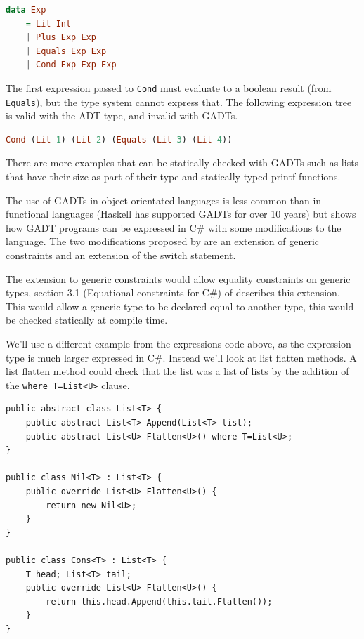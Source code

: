 \documentclass[english]{report}
\begin{document}
\begin{lstlisting}[caption={ADT},keywordstyle={\color{blue}},language=Haskell]
data Exp 
	= Lit Int
	| Plus Exp Exp 
	| Equals Exp Exp
	| Cond Exp Exp Exp
\end{lstlisting}


The first expression passed to \texttt{Cond} must evaluate to a boolean
result (from \texttt{Equals}), but the type system cannot express
that. The following expression tree is valid with the ADT type, and
invalid with GADTs.

\begin{lstlisting}[language=Haskell]
Cond (Lit 1) (Lit 2) (Equals (Lit 3) (Lit 4))
\end{lstlisting}


There are more examples that can be statically checked with GADTs
such as lists that have their size as part of their type and statically
typed printf functions.

The use of GADTs in object orientated languages is less common than
in functional languages (Haskell has supported GADTs for over 10 years)
but \cite{gadts} shows how GADT programs can be expressed in C\#
with some modifications to the language. The two modifications proposed
by \cite{gadts} are an extension of generic constraints and an extension
of the switch statement. 

The extension to generic constraints would allow equality constraints
on generic types, section 3.1 (Equational constraints for C\#) of
\cite{gadts} describes this extension. This would allow a generic
type to be declared equal to another type, this would be checked statically
at compile time. 

We'll use a different example from the expressions code above, as
the expression type is much larger expressed in C\#. Instead we'll
look at list flatten methods. A list flatten method could check that
the list was a list of lists by the addition of the \texttt{where
T=List<U>} clause.

\begin{lstlisting}[caption={C\# GADT},label={lis:csharp gadt},keywordstyle={\color{blue}},language=sharpc]
public abstract class List<T> {
	public abstract List<T> Append(List<T> list);
	public abstract List<U> Flatten<U>() where T=List<U>;
}

public class Nil<T> : List<T> {
	public override List<U> Flatten<U>() {
		return new Nil<U>;
	}
}

public class Cons<T> : List<T> {	
	T head; List<T> tail;
	public override List<U> Flatten<U>() {
		return this.head.Append(this.tail.Flatten());
	}
}
\end{lstlisting}
\end{document}
